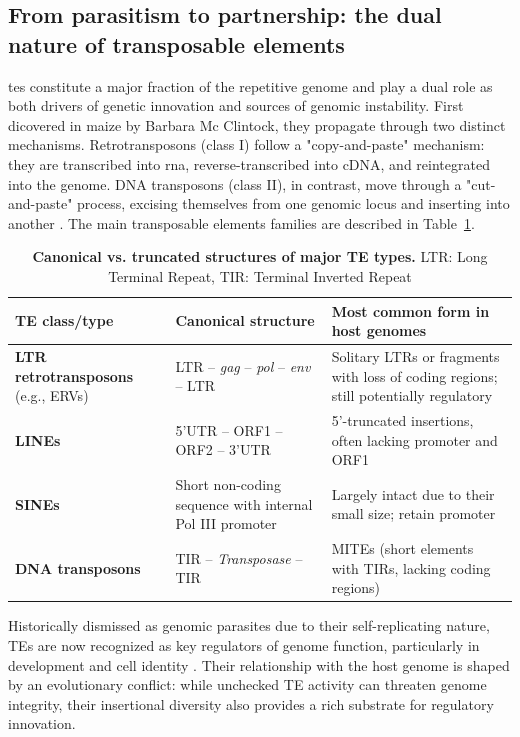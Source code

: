 \documentclass[11pt]{book}
\begin{document}
\subsection{From parasitism to partnership: the dual nature of transposable elements}
\glspl{te} constitute a major fraction of the repetitive genome and play a dual role as both drivers of genetic innovation and sources of genomic instability. First dicovered in maize by Barbara Mc Clintock\cite{mcclintock_origin_1950}, they propagate through two distinct mechanisms.  
Retrotransposons (class I) follow a "copy-and-paste" mechanism: they are transcribed into \gls{rna}, reverse-transcribed into cDNA, and reintegrated into the genome.  
DNA transposons (class II), in contrast, move through a "cut-and-paste" process, excising themselves from one genomic locus and inserting into another \cite{bourque_ten_2018}. The main transposable elements families are described in Table~\ref{tab:TE_structures}.

\begin{table}[htbp]
\vspace{2em}
\centering
\begin{tabular}{|p{3.5cm}|p{5.5cm}|p{5cm}|}
\hline
\textbf{TE class/type} & \textbf{Canonical structure} & \textbf{Most common form in host genomes} \\
\hline
\textbf{LTR retrotransposons} (e.g., ERVs) & LTR -- \textit{gag} -- \textit{pol} -- \textit{env} -- LTR & Solitary LTRs or fragments with loss of coding regions; still potentially regulatory \\
\hline
\textbf{LINEs} & 5'UTR -- ORF1 -- ORF2 -- 3'UTR & 5'-truncated insertions, often lacking promoter and ORF1 \\
\hline
\textbf{SINEs} & Short non-coding sequence with internal Pol III promoter & Largely intact due to their small size; retain promoter \\
\hline
\textbf{DNA transposons} & TIR -- \textit{Transposase} -- TIR & MITEs (short elements with TIRs, lacking coding regions) \\
\hline
\end{tabular}

\caption{\textbf{Canonical vs. truncated structures of major TE types.} LTR: Long Terminal Repeat, TIR: Terminal Inverted Repeat}
\label{tab:TE_structures}
\end{table}

Historically dismissed as genomic parasites due to their self-replicating nature, TEs are now recognized as key regulators of genome function, particularly in development and cell identity \cite{chuong_regulatory_2017}. Their relationship with the host genome is shaped by an evolutionary conflict: while unchecked TE activity can threaten genome integrity, their insertional diversity also provides a rich substrate for regulatory innovation.
\end{document}
